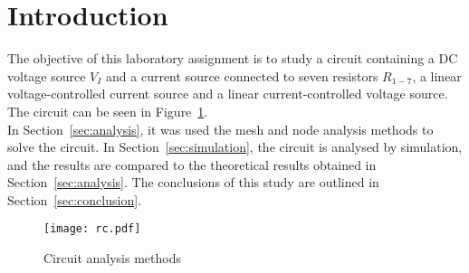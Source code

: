\section{Introduction}
\label{sec:introduction}

\par The objective of this laboratory assignment is to study a circuit containing a
DC voltage source $V_I$ and a current source connected to seven resistors $R_{1-7}$, a linear voltage-controlled current source and a  linear current-controlled voltage source. The circuit can be seen in Figure~\ref{fig:rc}.\\



In Section~\ref{sec:analysis}, it was used the mesh and node analysis methods to solve the circuit. In Section~\ref{sec:simulation}, the circuit is analysed by
simulation, and the results are compared to the theoretical results obtained in
Section~\ref{sec:analysis}. The conclusions of this study are outlined in
Section~\ref{sec:conclusion}.

\begin{figure}[h] \centering
\texttt{[image: rc.pdf]}
\caption{Circuit analysis methods}
\label{fig:rc}
\end{figure}
